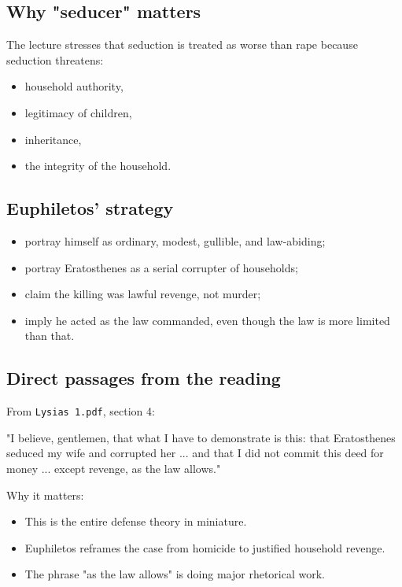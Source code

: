 \documentclass[11pt]{article}
\begin{document}
\subsection{Why "seducer" matters}

The lecture stresses that seduction is treated as worse than rape because seduction threatens:

\begin{itemize}
\item household authority,
\item legitimacy of children,
\item inheritance,
\item the integrity of the household.
\end{itemize}

\subsection{Euphiletos' strategy}

\begin{itemize}
\item portray himself as ordinary, modest, gullible, and law-abiding;
\item portray Eratosthenes as a serial corrupter of households;
\item claim the killing was lawful revenge, not murder;
\item imply he acted as the law commanded, even though the law is more limited than that.
\end{itemize}

\subsection{Direct passages from the reading}

From \texttt{Lysias 1.pdf}, section 4:

\begin{quotebox}
"I believe, gentlemen, that what I have to demonstrate is this: that Eratosthenes seduced my wife and corrupted her ... and that I did not commit this deed for money ... except revenge, as the law allows."
\end{quotebox}

Why it matters:

\begin{itemize}
\item This is the entire defense theory in miniature.
\item Euphiletos reframes the case from homicide to justified household revenge.
\item The phrase "as the law allows" is doing major rhetorical work.
\end{itemize}
\end{document}
